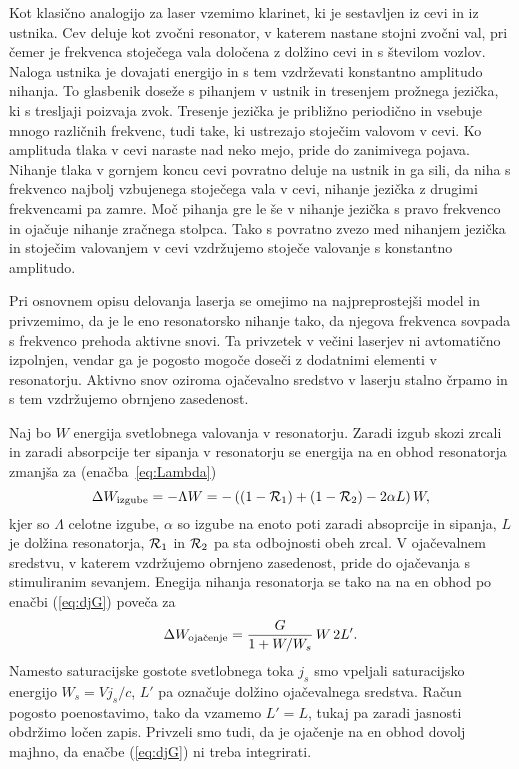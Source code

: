 \begin{remark}
Kot klasično analogijo za laser vzemimo klarinet, ki je sestavljen iz 
cevi in iz ustnika. Cev deluje kot zvočni resonator, v katerem nastane 
stojni zvočni val, pri čemer je frekvenca stoječega vala določena z 
dolžino cevi in s številom vozlov. Naloga ustnika je dovajati energijo 
in s tem vzdrževati konstantno amplitudo nihanja. To glasbenik doseže s 
pihanjem v ustnik in tresenjem prožnega jezička, ki s tresljaji poizvaja 
zvok. Tresenje jezička je približno periodično in vsebuje mnogo različnih 
frekvenc, tudi take, ki ustrezajo stoječim valovom v cevi. 
Ko amplituda tlaka v cevi naraste nad neko mejo, pride do zanimivega
pojava. Nihanje tlaka v gornjem koncu cevi povratno deluje na ustnik
in ga sili, da niha s frekvenco najbolj vzbujenega stoječega vala v cevi,
nihanje jezička z drugimi frekvencami pa zamre. Moč pihanja gre le še v
nihanje jezička s pravo frekvenco in ojačuje nihanje zračnega stolpca. 
Tako s povratno zvezo med nihanjem jezička in stoječim valovanjem v cevi
vzdržujemo stoječe valovanje s konstantno amplitudo. 
\end{remark}

Pri osnovnem opisu delovanja laserja se omejimo na najpreprostejši model in 
privzemimo, da je le eno resonatorsko nihanje tako, da njegova frekvenca
sovpada s frekvenco prehoda aktivne snovi. Ta privzetek v večini laserjev ni
avtomatično izpolnjen, vendar ga je pogosto mogoče doseči z dodatnimi elementi 
v resonatorju. Aktivno snov oziroma ojačevalno sredstvo v laserju stalno 
črpamo in s tem vzdržujemo obrnjeno zasedenost. 

Naj bo $W$ energija svetlobnega valovanja v resonatorju. Zaradi izgub skozi
zrcali in zaradi absorpcije ter sipanja v resonatorju se energija na en obhod 
resonatorja zmanjša za (enačba~\ref{eq:Lambda})
\begin{equation}
\Delta W_{\rm izgube}=-\Lambda W=-\left((1-{\cal {R}}_{1})+(1-{\cal {R}}_{2})
-2\alpha L\right)W,
\label{5.1}
\end{equation}
kjer so $\Lambda $ celotne izgube, $\alpha$ so izgube na enoto poti zaradi
absoprcije in sipanja, $L$ je dolžina resonatorja, 
${\cal {R}}_{1}$ in ${\cal {R}}_{2}$ pa sta odbojnosti
obeh zrcal. V ojačevalnem sredstvu, v katerem vzdržujemo obrnjeno zasedenost,
pride do ojačevanja s stimuliranim sevanjem. Enegija nihanja resonatorja 
se tako na na en obhod po enačbi (\ref{eq:djG}) poveča za 
\begin{equation}  
\Delta W_{\rm oja\check{c}enje}=\frac{G}{1+W/W_s}\,W\, 2L'.
\label{5.2}
\end{equation}
Namesto saturacijske gostote svetlobnega toka $j_s$ smo vpeljali
saturacijsko energijo $W_s=Vj_s/c$, $L'$ pa označuje dolžino ojačevalnega
sredstva. Račun pogosto poenostavimo, tako da vzamemo $L'=L$, tukaj pa zaradi
jasnosti obdržimo ločen zapis. Privzeli smo tudi, da je ojačenje na en
obhod dovolj majhno, da enačbe (\ref{eq:djG}) ni treba integrirati.

